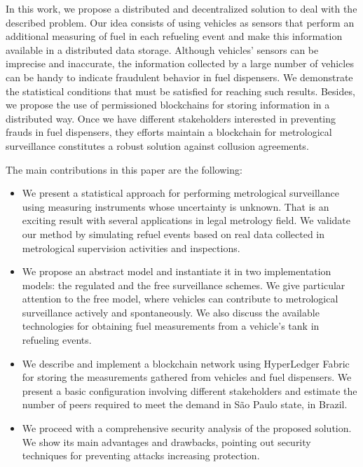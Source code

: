 \documentclass[sigplan]{acmart}
\begin{document}
In this work, we propose a distributed and decentralized solution to deal with the described problem.
Our idea consists of using vehicles as sensors that perform an additional measuring of fuel in each refueling event and make this information available in a distributed data storage.
Although vehicles' sensors can be imprecise and inaccurate, the information collected by a large number of vehicles can be handy to indicate fraudulent behavior in fuel dispensers.
We demonstrate the statistical conditions that must be satisfied for reaching such results.
Besides, we propose the use of permissioned blockchains for storing information in a distributed way.
Once we have different stakeholders interested in preventing frauds in fuel dispensers, they efforts maintain a blockchain for metrological surveillance constitutes a robust solution against collusion agreements.

The main contributions in this paper are the following:
\begin{itemize}
 \item We present a statistical approach for performing metrological surveillance using measuring instruments whose uncertainty is unknown. That is an exciting result with several applications in legal metrology field. We validate our method by simulating refuel events based on real data collected in metrological supervision activities and inspections.
 \item We propose an abstract model and instantiate it in two implementation models: the regulated and the free surveillance schemes. We give particular attention to the free model, where vehicles can contribute to metrological surveillance actively and spontaneously. We also discuss the available technologies for obtaining fuel measurements from a vehicle's tank in refueling events.
 \item We describe and implement a blockchain network using HyperLedger Fabric for storing the measurements gathered from vehicles and fuel dispensers. We present a basic configuration involving different stakeholders and estimate the number of peers required to meet the demand in São Paulo state, in Brazil.
 \item We proceed with a comprehensive security analysis of the proposed solution. We show its main advantages and drawbacks, pointing out security techniques for preventing attacks increasing protection.
\end{itemize}
\end{document}
